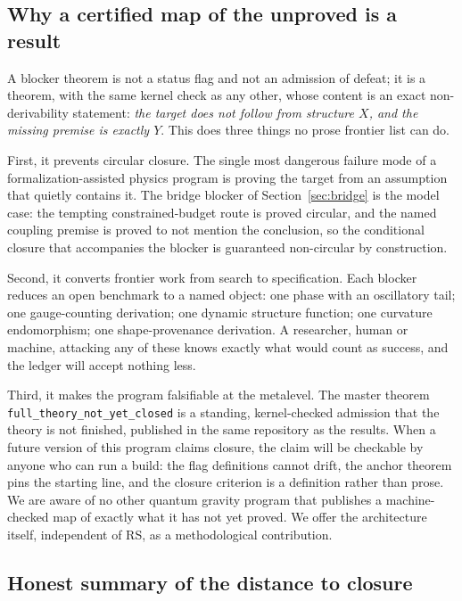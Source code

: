\documentclass[11pt,letterpaper]{article}
\newcommand{\lean}[1]{\texttt{#1}}
\begin{document}
\subsection{Why a certified map of the unproved is a result}
\label{sec:whyblockers}

A blocker theorem is not a status flag and not an admission of defeat; it is a theorem, with the same kernel check as any other, whose content is an exact non-derivability statement: \emph{the target does not follow from structure $X$, and the missing premise is exactly $Y$}. This does three things no prose frontier list can do.

First, it prevents circular closure. The single most dangerous failure mode of a formalization-assisted physics program is proving the target from an assumption that quietly contains it. The bridge blocker of Section~\ref{sec:bridge} is the model case: the tempting constrained-budget route is proved circular, and the named coupling premise is proved to not mention the conclusion, so the conditional closure that accompanies the blocker is guaranteed non-circular by construction.

Second, it converts frontier work from search to specification. Each blocker reduces an open benchmark to a named object: one phase with an oscillatory tail; one gauge-counting derivation; one dynamic structure function; one curvature endomorphism; one shape-provenance derivation. A researcher, human or machine, attacking any of these knows exactly what would count as success, and the ledger will accept nothing less.

Third, it makes the program falsifiable at the metalevel. The master theorem \lean{full\_theory\_not\_yet\_closed} is a standing, kernel-checked admission that the theory is not finished, published in the same repository as the results. When a future version of this program claims closure, the claim will be checkable by anyone who can run a build: the flag definitions cannot drift, the anchor theorem pins the starting line, and the closure criterion is a definition rather than prose. We are aware of no other quantum gravity program that publishes a machine-checked map of exactly what it has not yet proved. We offer the architecture itself, independent of RS, as a methodological contribution.

\subsection{Honest summary of the distance to closure}
\end{document}
